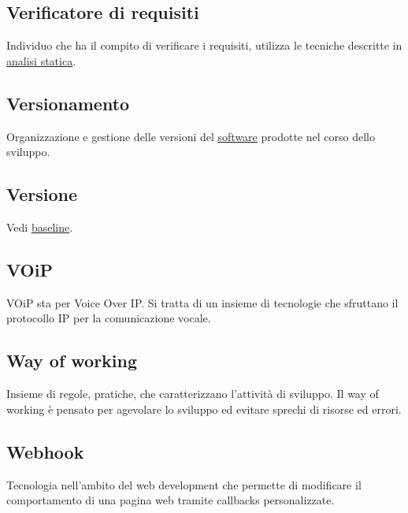 	\subsection{Verificatore di requisiti}
	\label{sec:verificatorerequisiti}
	Individuo che ha il compito di verificare i requisiti, utilizza le tecniche descritte in \underline{\hyperref[sec:analisistatica]{analisi statica}}.

	\subsection{Versionamento}
	\label{sec:versionamento}
	Organizzazione e gestione delle versioni del \underline{\hyperref[sec:prodottosoftware]{software}} prodotte nel corso dello sviluppo.

	\subsection{Versione}
	\label{sec:versione}
	Vedi \underline{\hyperref[sec:baseline]{baseline}}.
	
	\subsection{VOiP}
	\label{sec:voip}
	VOiP sta per Voice Over IP. Si tratta di un insieme di tecnologie che sfruttano il protocollo IP per la comunicazione vocale.
	
	
	 \newpage

	\subsection{Way of working}
	\label{sec:wow}
	Insieme di regole, pratiche, che caratterizzano l'attività di sviluppo. Il way of working è pensato per agevolare lo sviluppo ed evitare sprechi di risorse ed errori.

	\subsection{Webhook}
	\label{sec:webhook}
	Tecnologia nell'ambito del web development che permette di modificare il comportamento di una pagina web tramite callbacks personalizzate.

